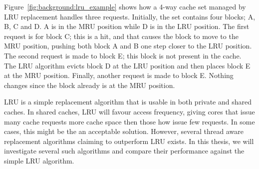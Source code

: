 Figure~\ref{fig:background:lru_example} shows how a 4-way cache set managed by LRU replacement handles three requests. 
Initially, the set contains four blocks; A, B, C and D. 
A is in the MRU position while D is in the LRU position.
The first request is for block C; this is a hit, and that causes the block to move to the MRU position, pushing both block A and B one step closer to the LRU position.
The second request is made to block E; this block is not present in the cache.
The LRU algorithm evicts block D at the LRU position and then places block E at the MRU position.
Finally, another request is made to block E. Nothing changes since the block already is at the MRU position.

LRU is a simple replacement algorithm that is usable in both private and shared caches.
In shared caches, LRU will favour access frequency, giving cores that issue many cache requests more cache space then those how issue few requests. 
In some cases, this might be the an acceptable solution. 
However, several thread aware replacement algorithms claiming to outperform LRU exists. 
In this thesis, we will investigate several such algorithms and compare their performance against the simple LRU algorithm.

